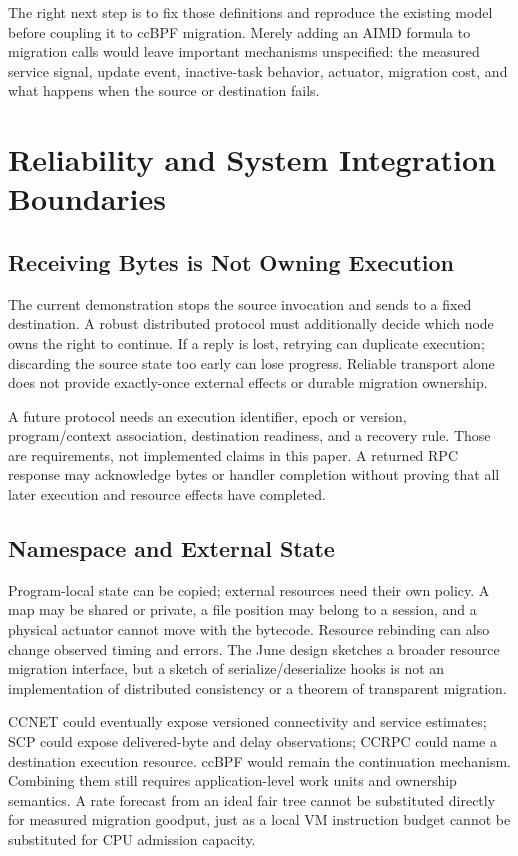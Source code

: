 \documentclass[conference,letterpaper]{IEEEtran}
\begin{document}
The right next step is to fix those definitions and reproduce the existing model before coupling it to ccBPF migration. Merely adding an AIMD formula to migration calls would leave important mechanisms unspecified: the measured service signal, update event, inactive-task behavior, actuator, migration cost, and what happens when the source or destination fails.

\section{Reliability and System Integration Boundaries}
\subsection{Receiving Bytes is Not Owning Execution}
The current demonstration stops the source invocation and sends to a fixed destination. A robust distributed protocol must additionally decide which node owns the right to continue. If a reply is lost, retrying can duplicate execution; discarding the source state too early can lose progress. Reliable transport alone does not provide exactly-once external effects or durable migration ownership.

A future protocol needs an execution identifier, epoch or version, program/context association, destination readiness, and a recovery rule. Those are requirements, not implemented claims in this paper. A returned RPC response may acknowledge bytes or handler completion without proving that all later execution and resource effects have completed.

\subsection{Namespace and External State}
Program-local state can be copied; external resources need their own policy. A map may be shared or private, a file position may belong to a session, and a physical actuator cannot move with the bytecode. Resource rebinding can also change observed timing and errors. The June design sketches a broader resource migration interface, but a sketch of serialize/deserialize hooks is not an implementation of distributed consistency or a theorem of transparent migration.

CCNET could eventually expose versioned connectivity and service estimates; SCP could expose delivered-byte and delay observations; CCRPC could name a destination execution resource. ccBPF would remain the continuation mechanism. Combining them still requires application-level work units and ownership semantics. A rate forecast from an ideal fair tree cannot be substituted directly for measured migration goodput, just as a local VM instruction budget cannot be substituted for CPU admission capacity.
\end{document}

